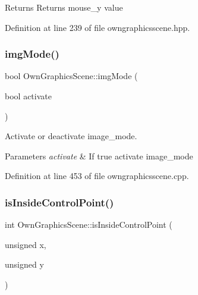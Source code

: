 \begin{DoxyReturn}{Returns}
Returns mouse\+\_\+y value 
\end{DoxyReturn}


Definition at line 239 of file owngraphicsscene.\+hpp.

\mbox{\label{classOwnGraphicsScene_acc6e7978a3f10889e439ceabd155a341}} 
\subsubsection{\texorpdfstring{img\+Mode()}{imgMode()}}
{\footnotesize\ttfamily bool Own\+Graphics\+Scene\+::img\+Mode (\begin{DoxyParamCaption}\item[{bool}]{activate }\end{DoxyParamCaption})}



Activate or deactivate image\+\_\+mode. 


\begin{DoxyParams}{Parameters}
{\em activate} & If true activate image\+\_\+mode \\
\hline
\end{DoxyParams}


Definition at line 453 of file owngraphicsscene.\+cpp.

\mbox{\label{classOwnGraphicsScene_ab8e0992d026eaeeda434d659c9c18a46}} 
\subsubsection{\texorpdfstring{is\+Inside\+Control\+Point()}{isInsideControlPoint()}}
{\footnotesize\ttfamily int Own\+Graphics\+Scene\+::is\+Inside\+Control\+Point (\begin{DoxyParamCaption}\item[{unsigned}]{x,  }\item[{unsigned}]{y }\end{DoxyParamCaption})}



